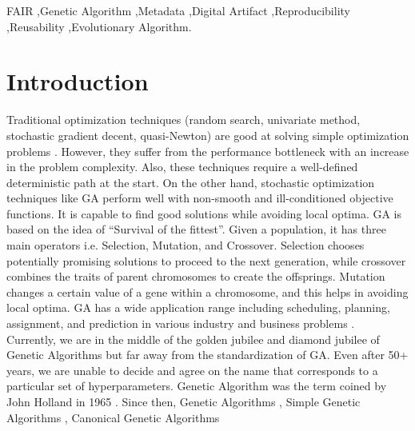 \documentclass[preprint,12pt]{elsarticle}
\begin{document}
\begin{frontmatter}
\begin{keyword}
FAIR \sep Genetic Algorithm \sep Metadata \sep Digital Artifact \sep Reproducibility \sep Reusability \sep Evolutionary Algorithm.



\end{keyword}

\end{frontmatter}


\section{Introduction}  \label{sec:Intro}
{T}{raditional} optimization techniques (random search, univariate method, stochastic gradient decent, quasi-Newton) are good at solving simple optimization problems \cite{chambers2019practical,mitchell1998introduction}. However, they suffer from the performance bottleneck with an increase in the problem complexity. Also, these techniques require a well-defined deterministic path at the start. On the other hand, stochastic optimization techniques like GA perform well with non-smooth and ill-conditioned objective functions. It is capable to find good solutions while avoiding local optima. GA is based on the idea of “Survival of the fittest”. Given a population, it has three main operators i.e. Selection, Mutation, and Crossover. Selection chooses potentially promising solutions to proceed to the next generation, while crossover combines the traits of parent chromosomes to create the offsprings. Mutation changes a certain value of a gene within a chromosome, and this helps in avoiding local optima. GA has a wide application range including scheduling, planning, assignment, and prediction in various industry and business problems \cite{liu2015scalable, trivedi2015hybridizing}.\\
Currently, we are in the middle of the golden jubilee and diamond jubilee of Genetic Algorithms but far away from the standardization of GA. Even after 50+ years, we are unable to decide and agree on the name that corresponds to a particular set of hyperparameters. Genetic Algorithm was the term coined by John Holland in 1965 \cite{chambers2019practical,mitchell1998introduction}. Since then, Genetic Algorithms \cite{chambers2019practical}, Simple Genetic Algorithms \cite{mitchell1998introduction}, Canonical Genetic Algorithms
\end{document}
